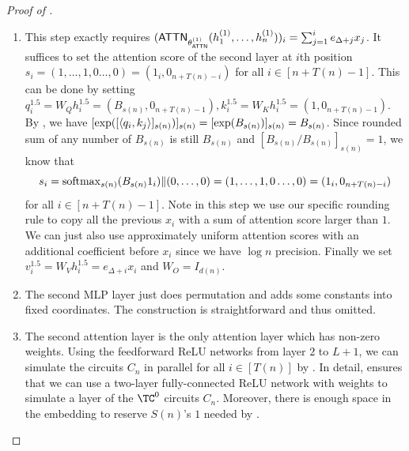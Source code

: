 \begin{proof}[Proof of ]
\begin{enumerate}
		\item This step exactly requires $(\mathsf{ATTN}_{\theta^{(1)}_{\mathsf{ATTN}}}(h^{(1)}_1,\ldots,h^{(1)}_n))_{i} = \sum_{j=1}^i e_{\Delta+j}x_j$. It suffices to set the attention score of the second layer at $i$th position  $s_i= (1,\ldots,1,0\ldots,0) = (1_i,0_{n+T(n)-i})$ for all $i\in[n+T(n)-1]$. This can be done by setting $q^{1.5}_i = W_Q h^{1.5}_i = (B_{s(n)}, 0_{n+T(n)-1}), k^{1.5}_i = W_K h^{1.5}_i = (1,0_{n+T(n)-1})$. By , we have $[\exp([\left\langle q_i,k_j \right\rangle]_{s(n)})]_{s(n)}=[\exp(B_{s(n)})]_{s(n)} = B_{s(n)}$. Since rounded sum of any number of $B_{s(n)}$ is still $B_{s(n)}$ and $[B_{s(n)}/B_{s(n)}]_{s(n)}=1$, we know that  
		$$s_i= \mathrm{softmax}_{s(n)}(B_{s(n)}1_{i}) \| (0,\ldots,0) = (1,\ldots,1,0\ldots,0) = (1_i,0_{n+T(n)-i})$$ 
		for all $i\in[n+T(n)-1]$. Note in this step we use our specific rounding rule to copy all the previous $x_i$ with a sum of attention score larger than $1$. We can just also use approximately uniform attention scores with an additional coefficient before $x_i$ since we have $\log n$ precision.
		Finally we set $v^{1.5}_i = W_V h^{1.5}_i = e_{\Delta+i}x_i$ and $W_O = I_{d(n)}$.
	\item The second MLP layer just does permutation and adds some constants into fixed coordinates. The construction is straightforward and thus omitted.
	\item The second attention layer is the only attention layer which has non-zero weights. Using the feedforward ReLU networks from layer $2$ to $L+1$, we can simulate the circuits $C_n$ in parallel for all $i\in[T(n)]$ by . In detail,  ensures that we can use a two-layer fully-connected ReLU network with weights  to simulate a layer of the $\TC^0$ circuits $C_n$. Moreover, there is enough space in the embedding to reserve $S(n)$'s $1$ needed by . 


\end{enumerate}
\end{proof}
